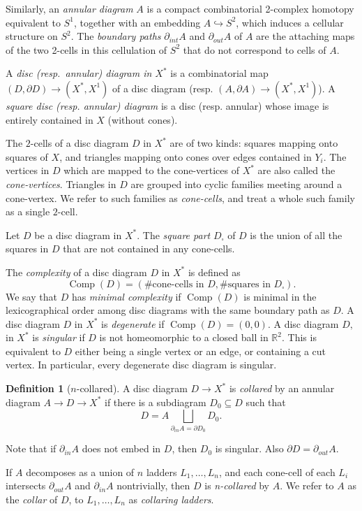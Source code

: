 \documentclass[12pt,oneside]{amsart}
\theoremstyle{definition}
\theoremstyle{definition}
\newtheorem{definition}[thm]{Definition}
\theoremstyle{remark}
\DeclareMathOperator{\Comp}{Comp}
\begin{document}
Similarly, an \emph{annular diagram} $A$ is a compact combinatorial 2-complex homotopy equivalent to $S^1$, together with an embedding $A \hookrightarrow S^2$, which induces a cellular structure on $S^2$. The \emph{boundary paths} $\partial_{int}A$ and $\partial_{out}A$ of $A$ are the attaching maps of the two 2-cells in this cellulation of $S^2$ that do not correspond to cells of $A$.


A \emph{disc (resp.\ annular) diagram in $X^*$} is a combinatorial map $(D,\partial D)\to(X^*, X^1)$ of a disc diagram (resp. $(A, \partial A) \rightarrow (X^*, X^1)$). 
A \emph{square disc (resp. annular) diagram} is a disc (resp. annular) whose image is entirely contained in $X$ (without cones).

The $2$-cells of a disc diagram $D$ in $X^*$ are of two kinds: squares mapping onto squares of $X$, and triangles mapping onto cones over edges contained in $Y_i$. 
The vertices in $D$ which are mapped to the cone-vertices of $X^*$ are also called the \emph{cone-vertices}. 
Triangles in $D$ are grouped into cyclic families meeting around a cone-vertex. 
We refer to such families as \emph{cone-cells}, and treat a whole such family as a single $2$-cell. 

Let $D$ be a disc diagram in $X^*$. The \emph{square part} $D_\square$ of $D$ is the union of all the squares in $D$
that are not contained in any cone-cells. 

The \emph{complexity} of a disc diagram $D$ in $X^*$ is defined as $$\Comp(D) = (\# \text{cone-cells in } D, \#\text{squares in $D_\square$}).$$ We say that $D$  has \emph{minimal complexity} if $\Comp(D)$ is minimal in the lexicographical order among disc diagrams with the same boundary path as $D$. A disc diagram $D$ in $X^*$ is \emph{degenerate} if $\Comp(D) = (0,0)$.
A disc diagram $D,$ in $X^*$ is \emph{singular} if $D$ is not homeomorphic to a closed ball in $\mathbb R^2$. This is equivalent to $D$ either being a single vertex or an edge, or containing a cut vertex. 
In particular, every degenerate disc diagram is singular.



\begin{definition}[$n$-collared]\label{defn: collared}
    A disc diagram $D \rightarrow X^*$ is \emph{collared} by an annular diagram $A \rightarrow D\to X^*$ if there is a subdiagram $D_0\subseteq D$ such that $$D= A \bigsqcup\limits_{\partial_{in} A = \partial D_0} D_0.$$
    
Note that if $\partial_{in}A$ does not embed in $D$, then $D_0$ is singular. Also $\partial D = \partial_{out}A$.

If $A$ decomposes as a union of $n$ ladders $L_1, \ldots, L_n$, and each cone-cell of each $L_i$ intersects  $\partial_{out} A$ and $\partial_{in} A$ nontrivially, then $D$ is \emph{n-collared} by $A$. We refer to $A$ as the \emph{collar} of $D$, to $L_1, \ldots, L_n$ as \emph{collaring ladders}.
\end{definition}
\end{document}
